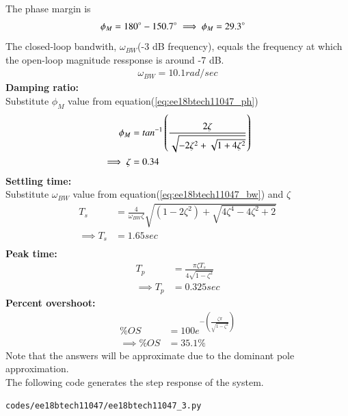 \begin{enumerate}[label=\thesubsection.\arabic*.,ref=\thesubsection.\theenumi]
\begin{figure}[!ht]
\caption{}
\label{fig:ee18btech11047_2}
\end{figure}
The phase margin is 
\begin{align}
\phi_{M} &= 180\degree-150.7\degree \implies \phi_{M} = 29.3\degree \label{eq:ee18btech11047_ph}
\end{align}
The closed-loop bandwith, $\omega_{BW}$(-3 dB frequency), equals the frequency at which the open-loop magnitude ressponse is around -7 dB.
\begin{align}
\omega_{BW} = 10.1  rad/sec \label{eq:ee18btech11047_bw}
\end{align}
\textbf{Damping ratio:} \\
Substitute $\phi_{M}$ value from equation(\ref{eq:ee18btech11047_ph})
\begin{align}
\phi_{M} &= {tan}^{-1}\left(\frac{2\zeta}{\sqrt{-2\zeta^{2}+\sqrt{1+4\zeta^{2}}}}\right)\\
\implies \zeta &= 0.34
\end{align}
\textbf{Settling time:} \\
Substitute $\omega_{BW}$ value from equation(\ref{eq:ee18btech11047_bw}) and $\zeta$
\begin{align}
T_{s}&= \frac{4}{\omega_{BW}\zeta}\sqrt{(1-2\zeta^2)+\sqrt{4\zeta^4-4\zeta^2+2}}\\
\implies T_{s} &= 1.65 sec   \\
\end{align}
\textbf{Peak time:}
\begin{align}
T_{p} &= \frac{\pi\zeta T_{s}}{4\sqrt{1-\zeta^2}}\\
\implies T_{p} &= 0.325 sec
\end{align}
\textbf{Percent overshoot:}
\begin{align}
\% OS&=100e^{-(\frac{\zeta\pi}{\sqrt{1-\zeta^2}})}\\
\implies \% OS &= 35.1 \%
\end{align}
Note that the answers will be approximate due to the dominant pole approximation.\\
The following code generates the step response of the system.
\begin{lstlisting}
codes/ee18btech11047/ee18btech11047_3.py
\end{lstlisting}
\begin{figure}[!ht]
\centering

\end{figure}
\end{enumerate}
